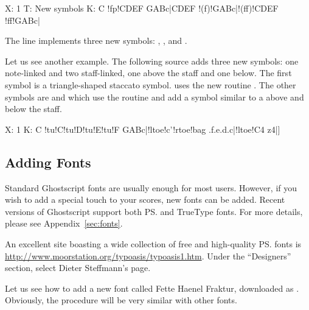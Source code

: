 \documentclass[a4paper,fullpage,12pt]{book}
\begin{document}
\begin{abcsource}
X: 1
T: New symbols
K: C
!fp!CDEF GABc|CDEF !(f)!GABc|!(ff)!CDEF !ff!GABc|
\end{abcsource}


The  line implements three new symbols: ,
, and .

Let us see another example. The following source adds three new
symbols: one note-linked and two staff-linked, one above the staff and
one below. The first symbol  is a triangle-shaped staccato
symbol.  uses the new routine . The other
symbols are  and  which use the routine
 and add a symbol similar to a \car{\textasciicircum} above
and below the staff.

\begin{abcsource}
X: 1
K: C
!tu!C!tu!D!tu!E!tu!F GABc|!ltoe!c'!rtoe!bag .f.e.d.c|!ltoe!C4 z4|]
\end{abcsource}



\subsection{Adding Fonts}
\label{sec:addfonts}

Standard Ghostscript fonts are usually enough for most users. However,
if you wish to add a special touch to your scores, new fonts can be
added. Recent versions of Ghostscript support both \ps{} and TrueType
fonts. For more details, please see Appendix~\ref{sec:fonts}.

An excellent site boasting a wide collection of free and high-quality
\ps{} fonts is
\url{http://www.moorstation.org/typoasis/typoasis1.htm}. Under the
``Designers'' section, select Dieter Steff\-man\-n's page.

Let us see how to add a new font called Fette Haenel Fraktur,
downloaded as . Obviously, the procedure will
be very similar with other fonts.
\end{document}

